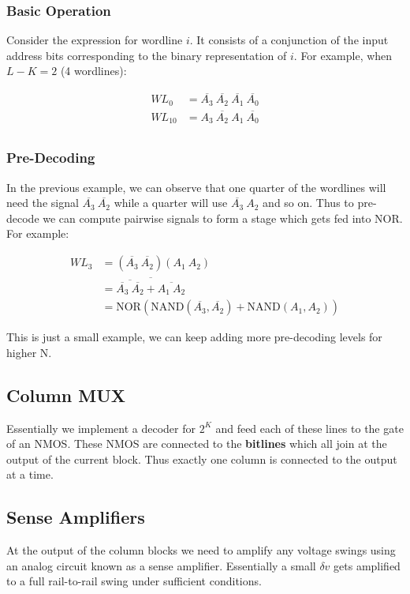 \documentclass[11pt]{report}
\begin{document}
\subsubsection{Basic Operation}
Consider the expression for wordline $i$. It consists of a conjunction of the input address bits corresponding to the binary representation of $i$. For example, when $L-K=2$ (4 wordlines):

\begin{align}
	WL_{0} &= \overline{A_3} \ \overline{A_2} \ \overline{A_1} \ \overline{A_0}\\
	WL_{10} &= A_3 \ \overline{A_2} \ A_1 \ \overline{A_0}\\
\end{align}

\subsubsection{Pre-Decoding}
In the previous example, we can observe that one quarter of the wordlines will need the signal $\overline{A_3} \ \overline{A_2}$ while a quarter will use $\overline{A_3} \ A_2$ and so on. Thus to pre-decode we can compute pairwise signals to form a stage which gets fed into NOR. For example:

\begin{align*}
	WL_{3} &= \left(\overline{A_3} \ \overline{A_2}\right) \left(A_1 \ A_2\right) \\
		   &= \overline{ \overline{\overline{A_3} \ \overline{A_2}} + \overline{A_1 \ A_2}} \\
		   &= \text{NOR}(\text{NAND}(\overline{A_3}, \overline{A_2}) + \text{NAND}(A_1, A_2))
\end{align*}

This is just a small example, we can keep adding more pre-decoding levels for higher N.

\subsection{Column MUX}
Essentially we implement a decoder for $2^K$ and feed each of these lines to the gate of an NMOS. These NMOS are connected to the \textbf{bitlines} which all join at the output of the current block. Thus exactly one column is connected to the output at a time.

\subsection{Sense Amplifiers}
At the output of the column blocks we need to amplify any voltage swings using an analog circuit known as a sense amplifier. Essentially a small $\delta{v}$ gets amplified to a full rail-to-rail swing under sufficient conditions.
\end{document}
